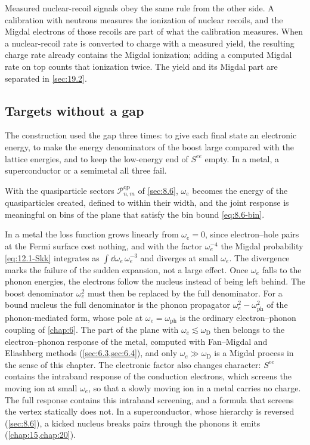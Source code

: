 Measured nuclear-recoil signals obey the same rule from the other side. A calibration with neutrons measures the ionization of nuclear recoils, and the Migdal electrons of those recoils are part of what the calibration measures. When a nuclear-recoil rate is converted to charge with a measured yield, the resulting charge rate already contains the Migdal ionization; adding a computed Migdal rate on top counts that ionization twice. The yield and its Migdal part are separated in \cref{sec:19.2}.

\subsection{Targets without a gap}\label{sec:12.1-gapless}

The construction used the gap three times: to give each final state an electronic energy, to make the energy denominators of the boost large compared with the lattice energies, and to keep the low-energy end of $S^{ee}$ empty. In a metal, a superconductor or a semimetal all three fail.

With the quasiparticle sectors $\mathcal{P}^{\mathrm{qp}}_{n,m}$ of \cref{sec:8.6}, $\omega_e$ becomes the energy of the quasiparticles created, defined to within their width, and the joint response is meaningful on bins of the plane that satisfy the bin bound \cref{eq:8.6-bin}.

In a metal the loss function grows linearly from $\omega_e = 0$, since electron--hole pairs at the Fermi surface cost nothing, and with the factor $\omega_e^{-4}$ the Migdal probability \cref{eq:12.1-Skk} integrates as $\int\dd\omega_e\,\omega_e^{-3}$ and diverges at small $\omega_e$. The divergence marks the failure of the sudden expansion, not a large effect. Once $\omega_e$ falls to the phonon energies, the electrons follow the nucleus instead of being left behind. The boost denominator $\omega_e^2$ must then be replaced by the full denominator. For a bound nucleus the full denominator is the phonon propagator $\omega_e^2 - \omega_{\mathrm{ph}}^2$ of the phonon-mediated form, whose pole at $\omega_e = \omega_{\mathrm{ph}}$ is the ordinary electron--phonon coupling of \cref{chap:6}. The part of the plane with $\omega_e \lesssim \omega_{\mathrm{D}}$ then belongs to the electron--phonon response of the metal, computed with Fan--Migdal and Eliashberg methods (\cref{sec:6.3,sec:6.4}), and only $\omega_e \gg \omega_{\mathrm{D}}$ is a Migdal process in the sense of this chapter. The electronic factor also changes character: $S^{ee}$ contains the intraband response of the conduction electrons, which screens the moving ion at small $\omega_e$, so that a slowly moving ion in a metal carries no charge. The full response contains this intraband screening, and a formula that screens the vertex statically does not. In a superconductor, whose hierarchy is reversed (\cref{sec:8.6}), a kicked nucleus breaks pairs through the phonons it emits (\cref{chap:15,chap:20}).
